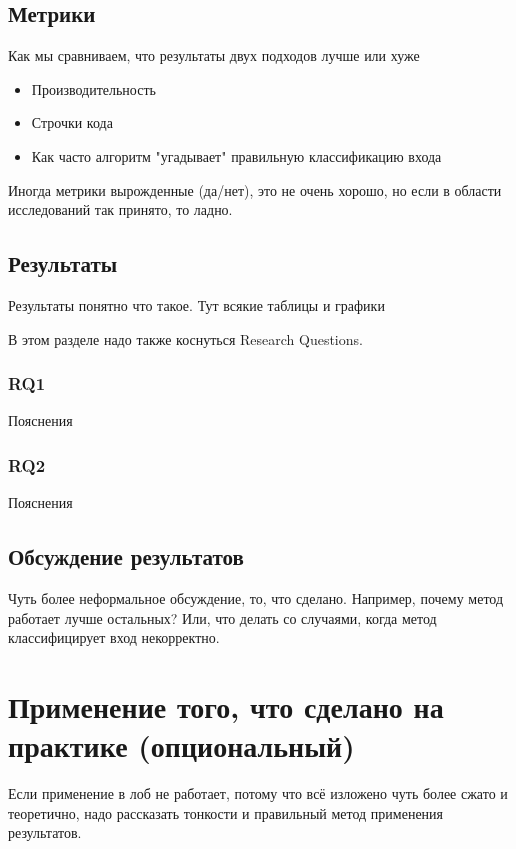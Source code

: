 \subsection{Метрики}

Как мы сравниваем, что результаты двух подходов лучше или хуже
\begin{itemize}
\item Производительность
\item Строчки кода
\item Как часто алгоритм "угадывает" правильную классификацию входа
\end{itemize}

Иногда метрики вырожденные (да/нет), это не очень хорошо, но если в области исследований так принято, то ладно.

\subsection{Результаты}
Результаты понятно что такое. Тут всякие таблицы и графики

В этом разделе надо также коснуться Research Questions.

\subsubsection{RQ1} Пояснения
\subsubsection{RQ2} Пояснения

\clearpage



\subsection{Обсуждение результатов}

Чуть более неформальное обсуждение, то, что сделано. Например, почему метод работает лучше остальных? Или, что делать со случаями, когда метод классифицирует вход некорректно.

\section{Применение того, что сделано на практике (опциональный)}

Если применение в лоб не работает, потому что всё изложено чуть более сжато и теоретично, надо рассказать тонкости и правильный метод применения результатов. 

